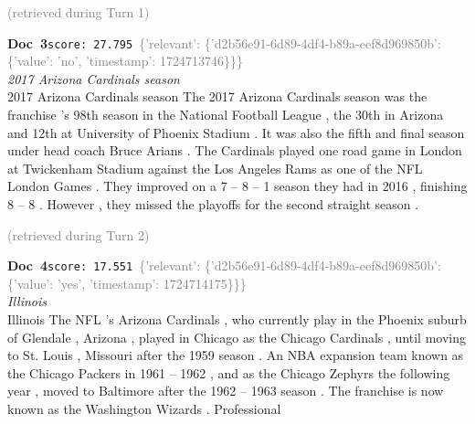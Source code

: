 \documentclass[a4paper,11pt]{article}
\begin{document}
\hfill{\tiny\textcolor{gray}{(retrieved during Turn 1)}}
\begin{docenv}
{\footnotesize\textcolor{doccolor}{\textbf{Doc~3}}}\hfill{\tiny\texttt{score:~27.795}}\ {\tiny\textcolor{gray}{\{'relevant': \{'d2b56e91-6d89-4df4-b89a-eef8d969850b': \{'value': 'no', 'timestamp': 1724713746\}\}\}}}\\[3pt]
{\small\textit{2017 Arizona Cardinals season}}\\[2pt]
\vspace{2pt}
{\footnotesize 2017 Arizona Cardinals season
The 2017 Arizona Cardinals season was the franchise 's 98th season in the National Football League , the 30th in Arizona and 12th at University of Phoenix Stadium . It was also the fifth and final season under head coach Bruce Arians . The Cardinals played one road game in London at Twickenham Stadium against the Los Angeles Rams as one of the NFL London Games . They improved on a 7 -- 8 -- 1 season they had in 2016 , finishing 8 -- 8 . However , they missed the playoffs for the second straight season .}
\end{docenv}
\hfill{\tiny\textcolor{gray}{(retrieved during Turn 2)}}
\begin{docenv}
{\footnotesize\textcolor{doccolor}{\textbf{Doc~4}}}\hfill{\tiny\texttt{score:~17.551}}\ {\tiny\textcolor{gray}{\{'relevant': \{'d2b56e91-6d89-4df4-b89a-eef8d969850b': \{'value': 'yes', 'timestamp': 1724714175\}\}\}}}\\[3pt]
{\small\textit{Illinois}}\\[2pt]
\vspace{2pt}
{\footnotesize Illinois
The NFL 's Arizona Cardinals , who currently play in the Phoenix suburb of Glendale , Arizona , played in Chicago as the Chicago Cardinals , until moving to St. Louis , Missouri after the 1959 season . An NBA expansion team known as the Chicago Packers in 1961 -- 1962 , and as the Chicago Zephyrs the following year , moved to Baltimore after the 1962 -- 1963 season . The franchise is now known as the Washington Wizards . Professional}
\end{docenv}
\end{document}
